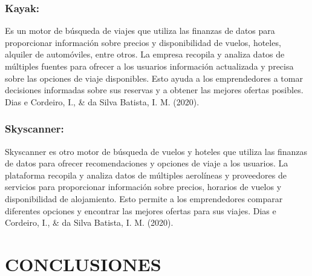 \documentclass[
  letterpaper,
  DIV=11,
  numbers=noendperiod]{scrreprt}
\begin{document}
\hypertarget{kayak}{%
\subsubsection{Kayak:}\label{kayak}}

Es un motor de búsqueda de viajes que utiliza las finanzas de datos para
proporcionar información sobre precios y disponibilidad de vuelos,
hoteles, alquiler de automóviles, entre otros. La empresa recopila y
analiza datos de múltiples fuentes para ofrecer a los usuarios
información actualizada y precisa sobre las opciones de viaje
disponibles. Esto ayuda a los emprendedores a tomar decisiones
informadas sobre sus reservas y a obtener las mejores ofertas posibles.
Dias e Cordeiro, I., \& da Silva Batista, I. M. (2020).

\hypertarget{skyscanner}{%
\subsubsection{Skyscanner:}\label{skyscanner}}

Skyscanner es otro motor de búsqueda de vuelos y hoteles que utiliza las
finanzas de datos para ofrecer recomendaciones y opciones de viaje a los
usuarios. La plataforma recopila y analiza datos de múltiples aerolíneas
y proveedores de servicios para proporcionar información sobre precios,
horarios de vuelos y disponibilidad de alojamiento. Esto permite a los
emprendedores comparar diferentes opciones y encontrar las mejores
ofertas para sus viajes. Dias e Cordeiro, I., \& da Silva Batista, I. M.
(2020).

\hypertarget{conclusiones}{%
\section{CONCLUSIONES}\label{conclusiones}}
\end{document}
